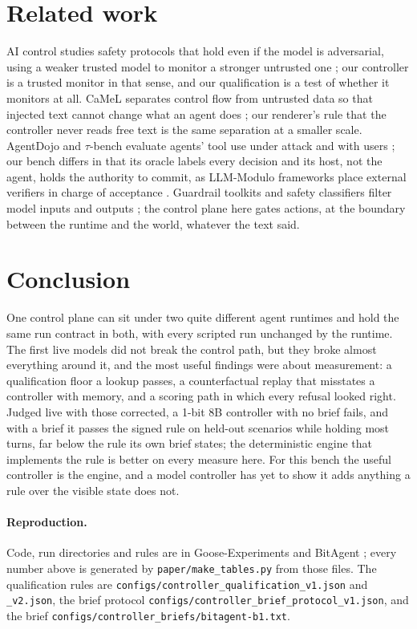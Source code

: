 \documentclass[11pt]{article}
\begin{document}
\section{Related work}

AI control studies safety protocols that hold even if the model is adversarial, using a weaker trusted model to monitor a stronger untrusted one \citep{greenblatt2024control}; our controller is a trusted monitor in that sense, and our qualification is a test of whether it monitors at all. CaMeL separates control flow from untrusted data so that injected text cannot change what an agent does \citep{debenedetti2025camel}; our renderer's rule that the controller never reads free text is the same separation at a smaller scale. AgentDojo and $\tau$-bench evaluate agents' tool use under attack and with users \citep{debenedetti2024agentdojo,yao2024taubench}; our bench differs in that its oracle labels every decision and its host, not the agent, holds the authority to commit, as LLM-Modulo frameworks place external verifiers in charge of acceptance \citep{kambhampati2024llmmodulo}. Guardrail toolkits and safety classifiers filter model inputs and outputs \citep{rebedea2023nemo,inan2023llamaguard}; the control plane here gates actions, at the boundary between the runtime and the world, whatever the text said.

\section{Conclusion}

One control plane can sit under two quite different agent runtimes and hold the same run contract in both, with every scripted run unchanged by the runtime. The first live models did not break the control path, but they broke almost everything around it, and the most useful findings were about measurement: a qualification floor a lookup passes, a counterfactual replay that misstates a controller with memory, and a scoring path in which every refusal looked right. Judged live with those corrected, a 1-bit 8B controller with no brief fails, and with a brief it passes the signed rule on held-out scenarios while holding most turns, far below the rule its own brief states; the deterministic engine that implements the rule is better on every measure here. For this bench the useful controller is the engine, and a model controller has yet to show it adds anything a rule over the visible state does not.

\paragraph{Reproduction.} Code, run directories and rules are in Goose-Experiments \citep{gooseexperiments2026} and BitAgent \citep{bitagent2026}; every number above is generated by \nolinkurl{paper/make_tables.py} from those files. The qualification rules are \nolinkurl{configs/controller_qualification_v1.json} and \nolinkurl{_v2.json}, the brief protocol \nolinkurl{configs/controller_brief_protocol_v1.json}, and the brief \nolinkurl{configs/controller_briefs/bitagent-b1.txt}.



\end{document}
